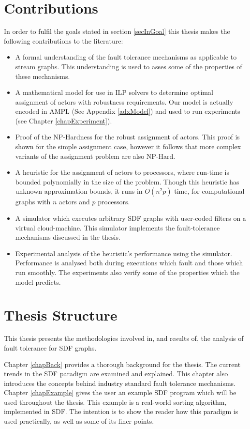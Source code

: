 \section{Contributions}

In order to fulfil the goals stated in section \ref{secInGoal} this thesis makes the following contributions to the literature:

\begin{itemize}
	\item A formal understanding of the fault tolerance mechanisms as applicable to stream graphs.
			This understanding is used to asses some of the properties of these mechanisms.
	\item A mathematical model for use in ILP solvers to determine optimal assignment of actors with robustness requirements.
			Our model is actually encoded in AMPL (See Appendix \ref{adxModel}) and used to run experiments (see Chapter \ref{chapExperiment}).
	\item Proof of the NP-Hardness for the robust assignment of actors.
			This proof is shown for the simple assignment case, however it follows that more complex variants of the assignment problem are also NP-Hard.
	\item A heuristic for the assignment of actors to processors, where run-time is bounded polynomially in the size of the problem.
			Though this heuristic has unknown approximation bounds, it runs in $O(n^2 p)$ time, for computational graphs with $n$ actors and $p$ processors.
	\item A simulator which executes arbitrary SDF graphs with user-coded filters on a virtual cloud-machine.
			This simulator implements the fault-tolerance mechanisms discussed in the thesis.
	\item Experimental analysis of the heuristic's performance using the simulator.
			Performance is analysed both during executions which fault and those which run smoothly.
			The experiments also verify some of the properties which the model predicts.
\end{itemize}

\section{Thesis Structure}

This thesis presents the methodologies involved in, and results of, the analysis of fault tolerance for SDF graphs.

Chapter \ref{chapBack} provides a thorough background for the thesis.
The current trends in the SDF paradigm are examined and explained.
This chapter also introduces the concepts behind industry standard fault tolerance mechanisms.
Chapter \ref{chapExample} gives the user an example SDF program which will be used throughout the thesis.
This example is a real-world sorting algorithm, implemented in SDF.
The intention is to show the reader how this paradigm is used practically, as well as some of its finer points.

